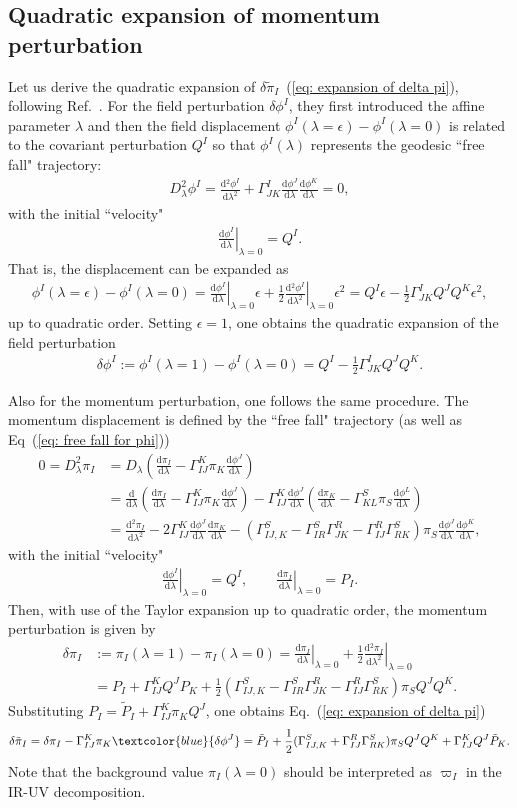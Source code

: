 \documentclass[aps, prd
, preprint
, nofootinbib 
, notitlepage
, longbibliography
]{revtex4-1}
\newcommand{\dif}[2]{\frac{\mathrm{d} #1}{\mathrm{d} #2}}
\newcommand{\bae}[1]{\begin{align} #1 \end{align}}
\newcommand{\mathblue}[1]{\textcolor{blue}{#1}}
\begin{document}
\subsection{Quadratic expansion of momentum perturbation}

Let us derive the quadratic expansion of $\delta\tilde{\pi}_I$~(\ref{eq: expansion of delta pi}), following Ref.~\cite{Gong:2011uw}.
For the field perturbation $\delta\phi^I$, they first introduced the affine parameter $\lambda$ and then the field displacement $\phi^I(\lambda=\epsilon)-\phi^I(\lambda=0)$ is related to the covariant perturbation $Q^I$ so that $\phi^I(\lambda)$ represents the geodesic ``free fall" trajectory:
\bae{\label{eq: free fall for phi}
    D_\lambda^2\phi^I=\dif{{}^2\phi^I}{\lambda^2}+\Gamma^I_{JK}\dif{\phi^J}{\lambda}\dif{\phi^K}{\lambda}=0,
}
with the initial ``velocity"
\bae{
    \left.\dif{\phi^I}{\lambda}\right|_{\lambda=0}=Q^I.
}
That is, the displacement can be expanded as
\bae{
    \phi^I(\lambda=\epsilon)-\phi^I(\lambda=0)=\left.\dif{\phi^I}{\lambda}\right|_{\lambda=0}\epsilon+\frac{1}{2}\left.\dif{{}^2\phi^I}{\lambda^2}\right|_{\lambda=0}\epsilon^2=Q^I\epsilon-\frac{1}{2}\Gamma^I_{JK}Q^JQ^K\epsilon^2,
}
up to quadratic order. Setting $\epsilon=1$, one obtains the quadratic expansion of the field perturbation
\bae{
    \delta\phi^I:=\phi^I(\lambda=1)-\phi^I(\lambda=0)=Q^I-\frac{1}{2}\Gamma^I_{JK}Q^JQ^K.
}

Also for the momentum perturbation, one follows the same procedure. The momentum displacement is defined by the ``free fall" trajectory (as well as Eq~(\ref{eq: free fall for phi}))
\bae{
    0=D_\lambda^2\pi_I&=D_\lambda\left(\dif{\pi_I}{\lambda}-\Gamma^K_{IJ}\pi_K\dif{\phi^J}{\lambda}\right) \nonumber \\
    &=\dif{}{\lambda}\left(\dif{\pi_I}{\lambda}-\Gamma^K_{IJ}\pi_K\dif{\phi^J}{\lambda}\right)-\Gamma^K_{IJ}\dif{\phi^J}{\lambda}\left(\dif{\pi_K}{\lambda}-\Gamma^S_{KL}\pi_S\dif{\phi^L}{\lambda}\right) \nonumber \\
    &=\dif{{}^2\pi_I}{\lambda^2}-2\Gamma^K_{IJ}\dif{\phi^J}{\lambda}\dif{\pi_K}{\lambda}-(\Gamma^S_{IJ,K}-\Gamma^S_{IR}\Gamma^R_{JK}-\Gamma^R_{IJ}\Gamma^S_{RK})\pi_S\dif{\phi^J}{\lambda}\dif{\phi^K}{\lambda},
}
with the initial ``velocity"
\bae{
    \left.\dif{\phi^I}{\lambda}\right|_{\lambda=0}=Q^I, \qquad \left.\dif{\pi_I}{\lambda}\right|_{\lambda=0}=P_I.
}
Then, with use of the Taylor expansion up to quadratic order, the momentum perturbation is given by
\bae{
    \delta\pi_I&:=\pi_I(\lambda=1)-\pi_I(\lambda=0)=\left.\dif{\pi_I}{\lambda}\right|_{\lambda=0}+\frac{1}{2}\left.\dif{{}^2\pi_I}{\lambda^2}\right|_{\lambda=0} \nonumber \\
    &=P_I+\Gamma^K_{IJ}Q^JP_K+\frac{1}{2}(\Gamma^S_{IJ,K}-\Gamma^S_{IR}\Gamma^R_{JK}-\Gamma^R_{IJ}\Gamma^S_{RK})\pi_SQ^JQ^K.
}
Substituting $P_I=\tilde{P}_I+\Gamma^K_{IJ}\pi_KQ^J$, one obtains Eq.~(\ref{eq: expansion of delta pi})
\bae{
    \delta\tilde{\pi}_I=\delta\pi_I-\Gamma^K_{IJ}\pi_K\mathblue{\delta\phi^J}=\tilde{P}_I+\frac{1}{2}(\Gamma^S_{IJ,K}+\Gamma^R_{IJ}\Gamma^S_{RK})\pi_SQ^JQ^K+\Gamma^K_{IJ}Q^J\tilde{P}_K.
}
Note that the background value $\pi_I(\lambda=0)$ should be interpreted as $\varpi_I$ in the IR-UV decomposition.
\end{document}
